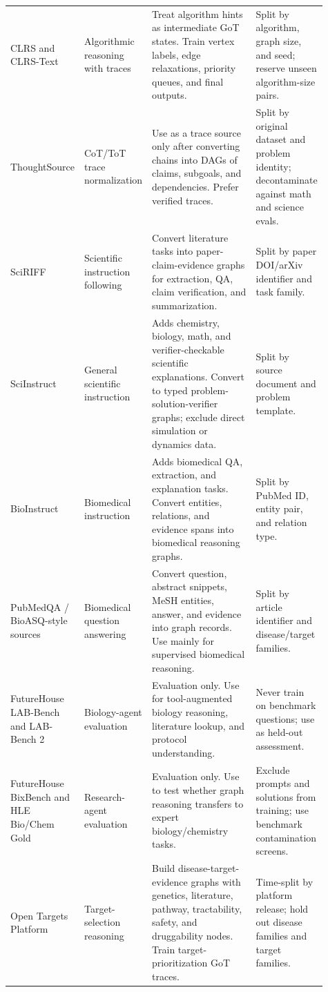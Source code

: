 \documentclass[11pt]{article}
\newcommand{\1}{\mathbf{1}}
\begin{document}
{\begin{longtable}{p{0.17\linewidth}p{0.16\linewidth}p{0.36\linewidth}p{0.22\linewidth}}
CLRS and CLRS-Text \cite{CLRS2022,CLRSText2024} & Algorithmic reasoning with traces & Treat algorithm hints as intermediate GoT states. Train vertex labels, edge relaxations, priority queues, and final outputs. & Split by algorithm, graph size, and seed; reserve unseen algorithm-size pairs. \\
ThoughtSource \cite{ThoughtSource2023} & CoT/ToT trace normalization & Use as a trace source only after converting chains into DAGs of claims, subgoals, and dependencies. Prefer verified traces. & Split by original dataset and problem identity; decontaminate against math and science evals. \\
SciRIFF \cite{SciRIFF2024} & Scientific instruction following & Convert literature tasks into paper-claim-evidence graphs for extraction, QA, claim verification, and summarization. & Split by paper DOI/arXiv identifier and task family. \\
SciInstruct \cite{SciInstruct2024} & General scientific instruction & Adds chemistry, biology, math, and verifier-checkable scientific explanations. Convert to typed problem-solution-verifier graphs; exclude direct simulation or dynamics data. & Split by source document and problem template. \\
BioInstruct \cite{BioInstruct2023} & Biomedical instruction & Adds biomedical QA, extraction, and explanation tasks. Convert entities, relations, and evidence spans into biomedical reasoning graphs. & Split by PubMed ID, entity pair, and relation type. \\
PubMedQA / BioASQ-style sources \cite{PubMedQA2019,BioASQ2024} & Biomedical question answering & Convert question, abstract snippets, MeSH entities, answer, and evidence into graph records. Use mainly for supervised biomedical reasoning. & Split by article identifier and disease/target families. \\
FutureHouse LAB-Bench and LAB-Bench 2 \cite{LABBench2024,LABBench2_2026} & Biology-agent evaluation & Evaluation only. Use for tool-augmented biology reasoning, literature lookup, and protocol understanding. & Never train on benchmark questions; use as held-out assessment. \\
FutureHouse BixBench and HLE Bio/Chem Gold \cite{BixBench2025,HLEBioChemGold2026} & Research-agent evaluation & Evaluation only. Use to test whether graph reasoning transfers to expert biology/chemistry tasks. & Exclude prompts and solutions from training; use benchmark contamination screens. \\
Open Targets Platform \cite{OpenTargets2026} & Target-selection reasoning & Build disease-target-evidence graphs with genetics, literature, pathway, tractability, safety, and druggability nodes. Train target-prioritization GoT traces. & Time-split by platform release; hold out disease families and target families. \\

\end{longtable}}
\end{document}
